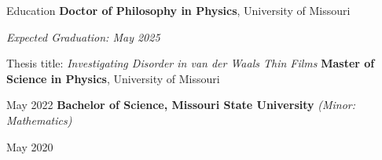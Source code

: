 \begin{rubric}{Education}
    \entry*[2021 -- 2025]%
        \textbf{Doctor of Philosophy in Physics}, University of Missouri 
        \par \textit{Expected Graduation: May 2025}
        \par Thesis title: \emph{Investigating Disorder in van der Waals Thin Films}
    \entry*[2020 -- 2022]%
        \textbf{Master of Science in Physics}, University of Missouri
        \par May 2022
    \entry*[2016 -- 2020]%
        \textbf{Bachelor of Science, Missouri State University} \hfill \textit{(Minor: Mathematics)}
        \par May 2020
\end{rubric}
